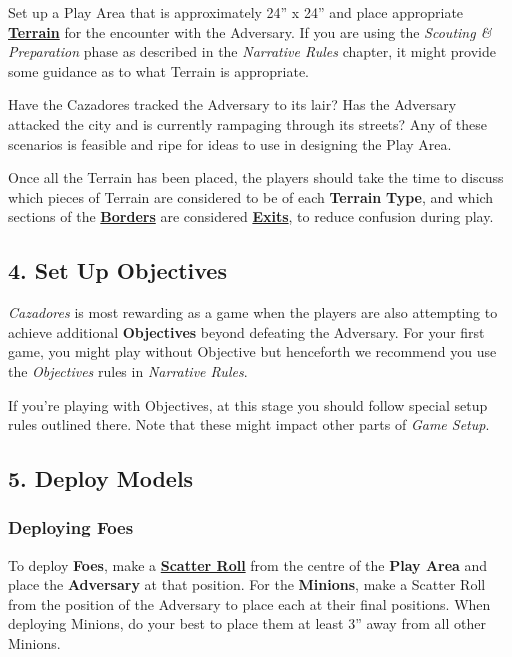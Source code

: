 \documentclass[
]{book}
\begin{document}
Set up a Play Area that is approximately 24'' x 24'' and place appropriate \textbf{\protect\hyperlink{terrain}{Terrain}} for the encounter with the Adversary. If you are using the \emph{Scouting \& Preparation} phase as described in the \emph{Narrative Rules} chapter, it might provide some guidance as to what Terrain is appropriate.

Have the Cazadores tracked the Adversary to its lair? Has the Adversary attacked the city and is currently rampaging through its streets? Any of these scenarios is feasible and ripe for ideas to use in designing the Play Area.

Once all the Terrain has been placed, the players should take the time to discuss which pieces of Terrain are considered to be of each \textbf{Terrain} \textbf{Type}, and which sections of the \textbf{\protect\hyperlink{borders}{Borders}} are considered \textbf{\protect\hyperlink{borders}{Exits}}, to reduce confusion during play.

\hypertarget{objsetup}{%
\subsection*{4. Set Up Objectives}\label{objsetup}}

\emph{Cazadores} is most rewarding as a game when the players are also attempting to achieve additional \textbf{Objectives} beyond defeating the Adversary. For your first game, you might play without Objective but henceforth we recommend you use the \emph{Objectives} rules in \emph{Narrative Rules}. 

If you're playing with Objectives, at this stage you should follow special setup rules outlined there. Note that these might impact other parts of \emph{Game Setup}.

\hypertarget{deploy}{%
\subsection*{5. Deploy Models}\label{deploy}}

\hypertarget{deploying-foes}{%
\subsubsection*{Deploying Foes}\label{deploying-foes}}

To deploy \textbf{Foes}, make a \textbf{\protect\hyperlink{scatter}{Scatter Roll}} from the centre of the \textbf{Play Area} and place the \textbf{Adversary} at that position. For the \textbf{Minions}, make a Scatter Roll from the position of the Adversary to place each at their final positions. When deploying Minions, do your best to place them at least 3'' away from all other Minions.
\end{document}
